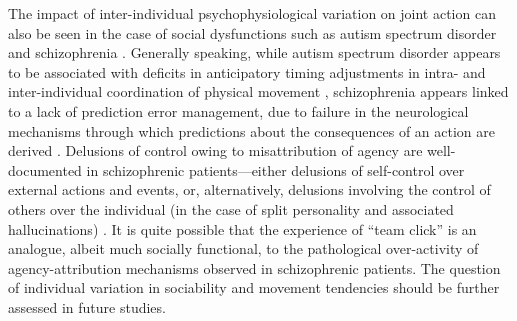   The impact of inter-individual psychophysiological variation on joint action can also be seen in the case of social dysfunctions such as autism spectrum disorder \citep{Isenhower2012} and schizophrenia \citep{Varlet2012}.  Generally speaking,  while autism spectrum disorder appears to be associated with deficits in anticipatory timing adjustments in intra- and inter-individual coordination of physical movement \citep{Martineau2010}, schizophrenia appears linked to a lack of prediction error management, due to failure in the neurological mechanisms through which predictions about the consequences of an action are derived \citep{Frith2000}.  Delusions of control owing to misattribution of agency are well-documented in schizophrenic patients---either delusions of self-control over external actions and events, or, alternatively, delusions involving the control of others over the individual (in the case of split personality and associated hallucinations) \citep{Frith2007}. It is quite possible that the experience of ``team click'' is an analogue, albeit much socially functional, to the pathological over-activity of agency-attribution mechanisms observed in schizophrenic patients.  The question of individual variation in sociability and movement tendencies should be further assessed in future studies.


